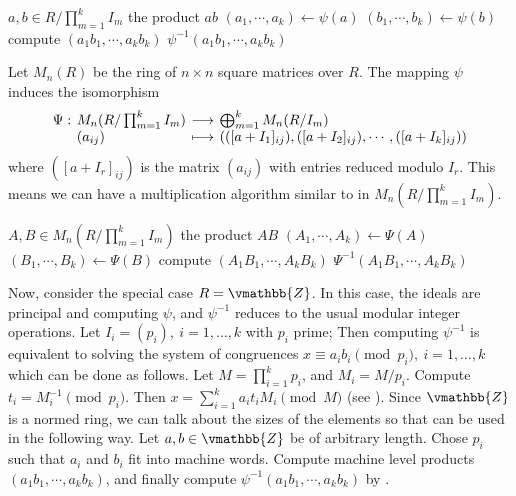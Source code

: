 \begin{algorithm}
[Multiplication in $R/\prod_{m = 1}^k {I_m}$]
\label{algorithm:labsMul}
\begin{algorithmic}[1]
\REQUIRE $a, b \in R/\prod_{m = 1}^k {I_m}$
\ENSURE  the product $ab$
\STATE $(a_1, \cdots, a_k) \leftarrow \psi(a)$
\STATE $(b_1, \cdots, b_k) \leftarrow \psi(b)$
\STATE compute $(a_1b_1, \cdots, a_kb_k)$
\RETURN $\psi^{-1}(a_1b_1, \cdots, a_kb_k)$
\end{algorithmic}
\end{algorithm}

Let $M_n(R)$ be the ring of $n \times n$ square matrices over $R$. The mapping $\psi$ induces the 
isomorphism
$$
\setlength\arraycolsep{2pt}
\begin{array}{llll}
\Psi : & M_n(R/\prod_{m = 1}^k {I_m}) & \longrightarrow & \bigoplus_{m = 1}^k M_n(R/I_m)\\
& (a_{ij}) & \longmapsto & (([a + I_1]_{ij}), ([a + I_2]_{ij}), \cdots, ([a + I_k]_{ij}))
\end{array}
$$
where $([a + I_r]_{ij})$ is the matrix $(a_{ij})$ with entries reduced modulo $I_r$. This means we 
can have a multiplication algorithm similar to  in $M_n(R/\prod_{m = 
1}^k {I_m})$.

\begin{algorithm}
[Multiplication in $M_n(R/\prod_{m = 1}^k {I_m})$]
\label{algorithm:labsMMul}
\begin{algorithmic}[1]
\REQUIRE $A, B \in M_n(R/\prod_{m = 1}^k {I_m})$
\ENSURE  the product $AB$
\STATE $(A_1, \cdots, A_k) \leftarrow \Psi(A)$
\label{step:Mn-reduction1}
\STATE $(B_1, \cdots, B_k) \leftarrow \Psi(B)$
\label{step:Mn-reduction2}
\STATE compute $(A_1B_1, \cdots, A_kB_k)$
\label{step:Mn-resmul}
\RETURN $\Psi^{-1}(A_1B_1, \cdots, A_kB_k)$
\label{step:Mn-inverse}
\end{algorithmic}
\end{algorithm}

Now, consider the special case $R = \vmathbb{Z}$. In this case, the ideals are principal and 
computing $\psi$, and $\psi^{-1}$ reduces to the usual modular integer operations. Let $I_i = (p_i), 
\: i = 1, \dots, k$ with $p_i$ prime; Then computing $\psi^{-1}$ is equivalent to solving the system 
of congruences $x \equiv a_ib_i \pmod {p_i}, \: i = 1, \dots, k$ which can be done as follows. Let 
$M = \prod_{i = 1}^k p_i$, and $M_i = M / p_i$. Compute $t_i = M_i^{-1} \pmod {p_i}$. Then $x  = 
\sum_{i = 1}^k a_it_iM_i \pmod M$ (see ). Since $\vmathbb{Z}$ is a 
normed ring, we can talk about the sizes of the elements so that   
can be used in the following way. Let $a, b \in \vmathbb{Z}$ be of arbitrary length. Chose $p_i$ such 
that $a_i$ and $b_i$ fit into machine words. Compute machine level products $(a_1b_1, \cdots, 
a_kb_k)$, and finally compute $\psi^{-1}(a_1b_1, \cdots, a_kb_k)$ by .

